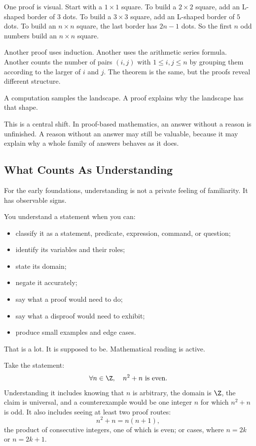One proof is visual. Start with a $1\times1$ square. To build a $2\times2$ square, add an L-shaped border of $3$ dots. To build a $3\times3$ square, add an L-shaped border of $5$ dots. To build an $n\times n$ square, the last border has $2n-1$ dots. So the first $n$ odd numbers build an $n\times n$ square.

Another proof uses induction. Another uses the arithmetic series formula. Another counts the number of pairs $(i,j)$ with $1\leq i,j\leq n$ by grouping them according to the larger of $i$ and $j$. The theorem is the same, but the proofs reveal different structure.

\begin{intuitionbox}
A computation samples the landscape. A proof explains why the landscape has that shape.
\end{intuitionbox}

This is a central shift. In proof-based mathematics, an answer without a reason is unfinished. A reason without an answer may still be valuable, because it may explain why a whole family of answers behaves as it does.

\subsection{What Counts As Understanding}

For the early foundations, understanding is not a private feeling of familiarity. It has observable signs.

You understand a statement when you can:

\begin{itemize}
\item classify it as a statement, predicate, expression, command, or question;
\item identify its variables and their roles;
\item state its domain;
\item negate it accurately;
\item say what a proof would need to do;
\item say what a disproof would need to exhibit;
\item produce small examples and edge cases.
\end{itemize}

That is a lot. It is supposed to be. Mathematical reading is active.

Take the statement:
\[
\forall n\in\Z,\quad n^2+n\text{ is even}.
\]
Understanding it includes knowing that $n$ is arbitrary, the domain is $\Z$, the claim is universal, and a counterexample would be one integer $n$ for which $n^2+n$ is odd. It also includes seeing at least two proof routes:
\[
n^2+n=n(n+1),
\]
the product of consecutive integers, one of which is even; or cases, where $n=2k$ or $n=2k+1$.

